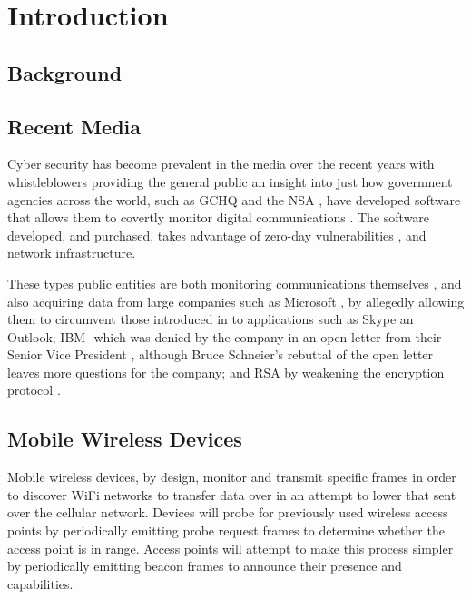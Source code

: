\section {Introduction}
\subsection{Background}
\subsection{Recent Media}
Cyber security has become prevalent in the media over the recent years with whistleblowers \cite{intro:guardian_snowden} providing the general public an insight into just how government agencies across the world, such as GCHQ \cite{intro:gchq_home}  and the NSA  \cite{intro:nsa_home}, have developed software \cite{intro:schneier_nsa_1}\cite{intro:schneier_nsa_3} that allows them to covertly monitor digital communications \cite{intro:schneier_nsa_4}. The software developed, and purchased, takes advantage of zero-day vulnerabilities \cite{intro:nsa_invoice}, and network infrastructure.

These types public entities are both monitoring communications themselves \cite{intro:schneier_nsa_2}, and also acquiring data from large companies such as Microsoft \cite{intro:guardian_ms_nsa}, by allegedly allowing them to circumvent those introduced in to applications such as Skype an Outlook; IBM- which was denied by the company in an open letter from their Senior Vice President \cite{intro:ibm_open_letter}, although Bruce Schneier’s rebuttal \cite{intro:open_open_letter} of the open letter leaves more questions for the company; and RSA by weakening the encryption protocol \cite{intro:bristol_open_letter}.

\subsection{Mobile Wireless Devices}
Mobile wireless devices, by design, monitor and transmit specific frames in order to discover WiFi networks to transfer data over in an attempt to lower that sent over the cellular network. Devices will probe for previously used wireless access points by periodically emitting probe request frames to determine whether the access point is in range. Access points will attempt to make this process simpler by periodically emitting beacon frames to announce their presence and capabilities.

